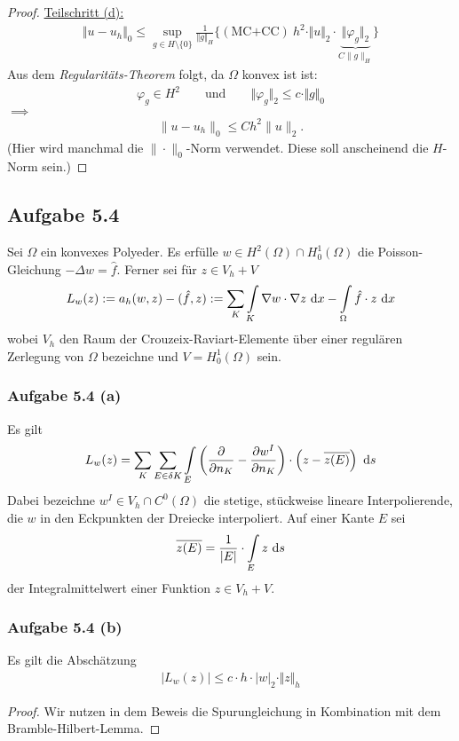 \begin{proof}

	\underline{Teilschritt (d):}
	\begin{align*}
		\Vert u-u_h\Vert_0\leq\sup\limits_{g\in H\setminus\lbrace0\rbrace}\frac{1}{\Vert g\Vert_H}\big\lbrace(\text{MC+CC})~h^2\cdot\Vert u\Vert_2\cdot\underbrace{\Vert\varphi_g\Vert_2}_{C\|g\|_H}\big\rbrace
		\end{align*}
	Aus dem \textit{Regularitäts-Theorem} folgt, da $\Omega$ konvex ist ist:
	\begin{align*}
		\varphi_g\in H^2\qquad\text{und}\qquad\Vert\varphi_g\Vert_2\leq c\cdot\Vert g\Vert_0
	\end{align*}
	$\implies$ 
	\begin{align*}
		\|u-u_h\|_0 \leq C h^2 \|u\|_2.
	\end{align*}
	(Hier wird manchmal die $\|\cdot\|_0$-Norm verwendet. Diese soll anscheinend die $H$-Norm sein.)
\end{proof}

\subsection{Aufgabe 5.4}
	Sei $\Omega$ ein konvexes Polyeder. 
	Es erfülle $w\in H^2(\Omega)\cap H_0^1(\Omega)$ die Poisson-Gleichung $-\Delta w=\hat{f}$. 
	Ferner sei für $z\in V_h+V$
	\begin{align*}
		L_w(z):=a_h(w,z)-(\hat{f},z):=\sum\limits_K\int\limits_K\nabla w\cdot\nabla z\text{ d} x-\int\limits_\Omega\hat{f}\cdot z\text{ d} x
	\end{align*}
	wobei $V_h$ den Raum der Crouzeix-Raviart-Elemente über einer regulären Zerlegung von $\Omega$ bezeichne und $V=H_0^1(\Omega)$ sein.

\subsubsection{Aufgabe 5.4 (a)}
Es gilt
\begin{align*}
	L_w(z)=\sum\limits_K\sum\limits_{E\in\delta K}\int\limits_E\left(\frac{\partial}{\partial n_K}-\frac{\partial w^I}{\partial n_K}\right)\cdot\left(z-\overline{z(E)}\right)\text{ d} s
\end{align*}
Dabei bezeichne $w^I\in V_h\cap C^0(\Omega)$ die stetige, stückweise lineare Interpolierende, die $w$ in den Eckpunkten der Dreiecke interpoliert. 
Auf einer Kante $E$ sei
\begin{align*}
	\overline{z(E)}=\frac{1}{|E|}\cdot\int\limits_E z\text{ d} s
\end{align*}
der Integralmittelwert einer Funktion $z\in V_h+V$.

\subsubsection{Aufgabe 5.4 (b)}
Es gilt die Abschätzung
\begin{align*}
	\big|L_w(z)\big|\leq c\cdot h\cdot|w|_2\cdot\Vert z\Vert_h
\end{align*}

\begin{proof}
	Wir nutzen in dem Beweis die Spurungleichung in Kombination mit dem \\ Bramble-Hilbert-Lemma.
\end{proof}
